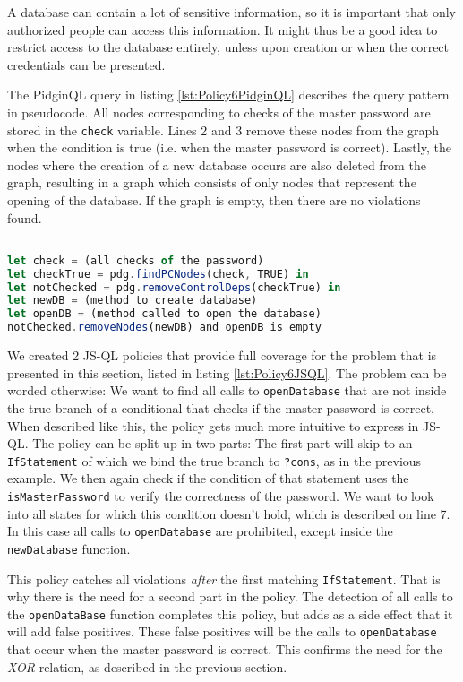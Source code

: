 A database can contain a lot of sensitive information, so it is important that only authorized people can access this information. It might thus be a good idea to restrict access to the database entirely, unless upon creation or when the correct credentials can be presented. 

The PidginQL query in listing \ref{lst:Policy6PidginQL} describes the query pattern in pseudocode. All nodes corresponding to checks of the master password are stored in the \texttt{check} variable. Lines 2 and 3 remove these nodes from the graph when the condition is true (i.e. when the master password is correct). Lastly, the nodes where the creation of a new database occurs are also deleted from the graph, resulting in a graph which consists of only nodes that represent the opening of the database. If the graph is empty, then there are no violations found.

\begin{lstlisting}[label={lst:Policy6PidginQL},language=JavaScript,caption=Policy 6 in PidginQL,mathescape=true]  % float=t?

let check = (all checks of the password)
let checkTrue = pdg.findPCNodes(check, TRUE) in
let notChecked = pdg.removeControlDeps(checkTrue) in
let newDB = (method to create database)
let openDB = (method called to open the database)
notChecked.removeNodes(newDB) and openDB is empty
\end{lstlisting}

We created 2 JS-QL policies that provide full coverage for the problem that is presented in this section, listed in listing \ref{lst:Policy6JSQL}. The problem can be worded otherwise: We want to find all calls to \texttt{openDatabase} that are not inside the true branch of a conditional that checks if the master password is correct. When described like this, the policy gets much more intuitive to express in JS-QL. The policy can be split up in two parts: The first part will skip to an \texttt{IfStatement} of which we bind the true branch to \texttt{?cons}, as in the previous example. We then again check if the condition of that statement uses the \texttt{isMasterPassword} to verify the correctness of the password. We want to look into all states for which this condition doesn't hold, which is described on line 7. In this case all calls to \texttt{openDatabase} are prohibited, except inside the \texttt{newDatabase} function. 

This policy catches all violations \textit{after} the first matching \texttt{IfStatement}. That is why there is the need for a second part in the policy. The detection of all calls to the \texttt{openDataBase} function completes this policy, but adds as a side effect that it will add false positives. These false positives will be the calls to \texttt{openDatabase} that occur when the master password is correct. This confirms the need for the \textit{XOR} relation, as described in the previous section. 

